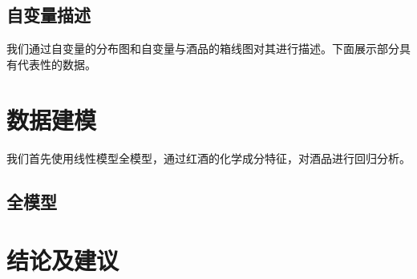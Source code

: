 \documentclass[fontset=ubuntu]{ctexart}
\begin{document}
        \subsection{自变量描述}
            我们通过自变量的分布图和自变量与酒品的箱线图对其进行描述。下面展示部分具有代表性的数据。

            \subsubsection{}

    \section{数据建模}
        我们首先使用线性模型全模型，通过红酒的化学成分特征，对酒品进行回归分析。

        \subsection{全模型}

    \section{结论及建议}

    \newpage
\end{document}
